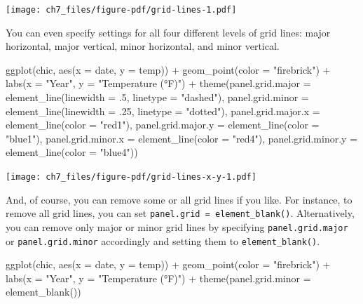 \documentclass[
  letterpaper,
]{scrbook}
\newenvironment{Shaded}{\begin{snugshade}}{\end{snugshade}}
\newcommand{\AttributeTok}[1]{\textcolor[rgb]{0.40,0.45,0.13}{#1}}
\newcommand{\DecValTok}[1]{\textcolor[rgb]{0.68,0.00,0.00}{#1}}
\newcommand{\FunctionTok}[1]{\textcolor[rgb]{0.28,0.35,0.67}{#1}}
\newcommand{\NormalTok}[1]{\textcolor[rgb]{0.00,0.23,0.31}{#1}}
\newcommand{\SpecialCharTok}[1]{\textcolor[rgb]{0.37,0.37,0.37}{#1}}
\newcommand{\StringTok}[1]{\textcolor[rgb]{0.13,0.47,0.30}{#1}}
\begin{document}
\texttt{[image: ch7\_files/figure-pdf/grid-lines-1.pdf]}

You can even specify settings for all four different levels of grid
lines: major horizontal, major vertical, minor horizontal, and minor
vertical.

\begin{Shaded}
\begin{Highlighting}[]
\FunctionTok{ggplot}\NormalTok{(chic, }\FunctionTok{aes}\NormalTok{(}\AttributeTok{x =}\NormalTok{ date, }\AttributeTok{y =}\NormalTok{ temp)) }\SpecialCharTok{+}
  \FunctionTok{geom\_point}\NormalTok{(}\AttributeTok{color =} \StringTok{"firebrick"}\NormalTok{) }\SpecialCharTok{+}
  \FunctionTok{labs}\NormalTok{(}\AttributeTok{x =} \StringTok{"Year"}\NormalTok{, }\AttributeTok{y =} \StringTok{"Temperature (°F)"}\NormalTok{) }\SpecialCharTok{+}
  \FunctionTok{theme}\NormalTok{(}\AttributeTok{panel.grid.major =} \FunctionTok{element\_line}\NormalTok{(}\AttributeTok{linewidth =}\NormalTok{ .}\DecValTok{5}\NormalTok{, }\AttributeTok{linetype =} \StringTok{"dashed"}\NormalTok{),}
        \AttributeTok{panel.grid.minor =} \FunctionTok{element\_line}\NormalTok{(}\AttributeTok{linewidth =}\NormalTok{ .}\DecValTok{25}\NormalTok{, }\AttributeTok{linetype =} \StringTok{"dotted"}\NormalTok{),}
        \AttributeTok{panel.grid.major.x =} \FunctionTok{element\_line}\NormalTok{(}\AttributeTok{color =} \StringTok{"red1"}\NormalTok{),}
        \AttributeTok{panel.grid.major.y =} \FunctionTok{element\_line}\NormalTok{(}\AttributeTok{color =} \StringTok{"blue1"}\NormalTok{),}
        \AttributeTok{panel.grid.minor.x =} \FunctionTok{element\_line}\NormalTok{(}\AttributeTok{color =} \StringTok{"red4"}\NormalTok{),}
        \AttributeTok{panel.grid.minor.y =} \FunctionTok{element\_line}\NormalTok{(}\AttributeTok{color =} \StringTok{"blue4"}\NormalTok{))}
\end{Highlighting}
\end{Shaded}

\texttt{[image: ch7\_files/figure-pdf/grid-lines-x-y-1.pdf]}

And, of course, you can remove some or all grid lines if you like. For
instance, to remove all grid lines, you can set
\texttt{panel.grid\ =\ element\_blank()}. Alternatively, you can remove
only major or minor grid lines by specifying \texttt{panel.grid.major}
or \texttt{panel.grid.minor} accordingly and setting them to
\texttt{element\_blank()}.

\begin{Shaded}
\begin{Highlighting}[]
\FunctionTok{ggplot}\NormalTok{(chic, }\FunctionTok{aes}\NormalTok{(}\AttributeTok{x =}\NormalTok{ date, }\AttributeTok{y =}\NormalTok{ temp)) }\SpecialCharTok{+}
  \FunctionTok{geom\_point}\NormalTok{(}\AttributeTok{color =} \StringTok{"firebrick"}\NormalTok{) }\SpecialCharTok{+}
  \FunctionTok{labs}\NormalTok{(}\AttributeTok{x =} \StringTok{"Year"}\NormalTok{, }\AttributeTok{y =} \StringTok{"Temperature (°F)"}\NormalTok{) }\SpecialCharTok{+}
  \FunctionTok{theme}\NormalTok{(}\AttributeTok{panel.grid.minor =} \FunctionTok{element\_blank}\NormalTok{())}
\end{Highlighting}
\end{Shaded}
\end{document}
